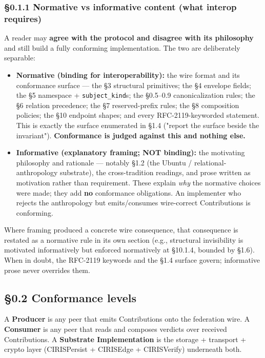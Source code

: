 \documentclass[11pt]{article}
\begin{document}
\subsubsection*{§0.1.1 Normative vs informative content (what interop requires)}


A reader may \textbf{agree with the protocol and disagree with its philosophy} and still build a fully conforming implementation. The two are deliberately separable:


\begin{itemize}\setlength\itemsep{0pt}
\item \textbf{Normative (binding for interoperability):} the wire format and its conformance surface — the §3 structural primitives; the §4 envelope fields; the §5 namespace + \texttt{subject\_kind}s; the §0.5–0.9 canonicalization rules; the §6 relation precedence; the §7 reserved-prefix rules; the §8 composition policies; the §10 endpoint shapes; and every RFC-2119-keyworded statement. This is exactly the surface enumerated in §1.4 ("report the surface beside the invariant"). \textbf{Conformance is judged against this and nothing else.}
\item \textbf{Informative (explanatory framing; NOT binding):} the motivating philosophy and rationale — notably §1.2 (the Ubuntu / relational-anthropology substrate), the cross-tradition readings, and prose written as motivation rather than requirement. These explain \textit{why} the normative choices were made; they add \textbf{no} conformance obligations. An implementer who rejects the anthropology but emits/consumes wire-correct Contributions is conforming.
\end{itemize}


Where framing produced a concrete wire consequence, that consequence is restated as a normative rule in its own section (e.g., structural invisibility is motivated informatively but enforced normatively at §10.1.4, bounded by §1.6). When in doubt, the RFC-2119 keywords and the §1.4 surface govern; informative prose never overrides them.



\subsection*{§0.2 Conformance levels}


A \textbf{Producer} is any peer that emits Contributions onto the federation wire. A \textbf{Consumer} is any peer that reads and composes verdicts over received Contributions. A \textbf{Substrate Implementation} is the storage + transport + crypto layer (CIRISPersist + CIRISEdge + CIRISVerify) underneath both.
\end{document}
